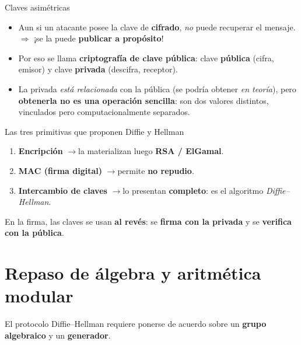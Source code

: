 \documentclass[11pt,a4paper]{article}
\begin{document}
\begin{defbox}{Claves asimétricas}
\begin{itemize}[leftmargin=1.4em,itemsep=2pt]
  \item Aun si un atacante posee la clave de \textbf{cifrado}, \emph{no} puede recuperar el
        mensaje. $\Rightarrow$ ¡se la puede \textbf{publicar a propósito}!
  \item Por eso se llama \textbf{criptografía de clave pública}: clave \textbf{pública} (cifra,
        emisor) y clave \textbf{privada} (descifra, receptor).
  \item La privada \emph{está relacionada} con la pública (se podría obtener \emph{en
        teoría}), pero \textbf{obtenerla no es una operación sencilla}: son dos valores
        distintos, vinculados pero computacionalmente separados.
\end{itemize}
\end{defbox}

\begin{practbox}{Las tres primitivas que proponen Diffie y Hellman}
\begin{enumerate}[leftmargin=1.6em,itemsep=2pt]
  \item \textbf{Encripción} \quad$\longrightarrow$\quad la materializan luego \textbf{RSA / ElGamal}.
  \item \textbf{MAC (firma digital)} \quad$\longrightarrow$\quad permite \textbf{no repudio}.
  \item \textbf{Intercambio de claves} \quad$\longrightarrow$\quad lo presentan \textbf{completo}:
        es el algoritmo \emph{Diffie--Hellman}.
\end{enumerate}
En la firma, las claves se usan \textbf{al revés}: se \textbf{firma con la privada} y se
\textbf{verifica con la pública}.
\end{practbox}

\section{Repaso de álgebra y aritmética modular}

El protocolo Diffie--Hellman requiere ponerse de acuerdo sobre un \textbf{grupo algebraico} y
un \textbf{generador}.
\end{document}
